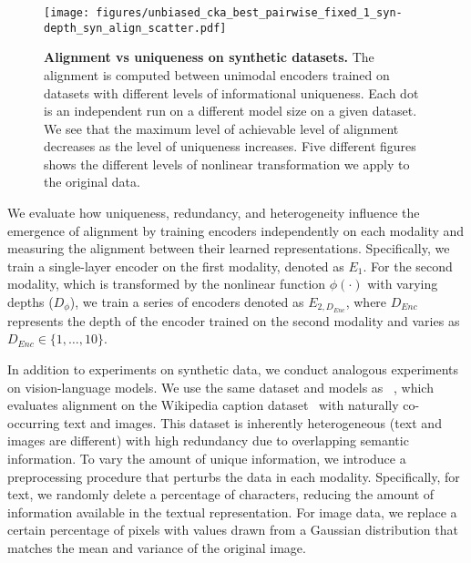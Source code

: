 \begin{figure*}[t!]
    \centering
    \texttt{[image: figures/unbiased\_cka\_best\_pairwise\_fixed\_1\_syn-depth\_syn\_align\_scatter.pdf]}
    \vspace{-2em}
    \caption{\textbf{Alignment vs uniqueness on synthetic datasets.} The alignment is computed between unimodal encoders trained on datasets with different levels of informational uniqueness. Each dot is an independent run on a different model size on a given dataset. We see that the maximum level of achievable level of alignment decreases as the level of uniqueness increases. Five different figures shows the different levels of nonlinear transformation we apply to the original data.}
    \label{fig:align_unique}
\end{figure*}
We evaluate how uniqueness, redundancy, and heterogeneity influence the emergence of alignment by training encoders independently on each modality and measuring the alignment between their learned representations. Specifically, we train a single-layer encoder on the first modality, denoted as \(E_1\). For the second modality, which is transformed by the nonlinear function \(\phi(\cdot)\) with varying depths (\(D_\phi\)), we train a series of encoders denoted as \(E_{2,D_{Enc}}\), where \(D_{Enc}\) represents the depth of the encoder trained on the second modality and varies as \(D_{Enc} \in \{1, \ldots, 10\}\).

In addition to experiments on synthetic data, we conduct analogous experiments on vision-language models. We use the same dataset and models as ~\citet{huh_platonic_2024}, which evaluates alignment on the Wikipedia caption dataset~\citep{srinivasan_wit_2021} with naturally co-occurring text and images. This dataset is inherently heterogeneous (text and images are different) with high redundancy due to overlapping semantic information. To vary the amount of unique information, we introduce a preprocessing procedure that perturbs the data in each modality. Specifically, for text, we randomly delete a percentage of characters, reducing the amount of information available in the textual representation. For image data, we replace a certain percentage of pixels with values drawn from a Gaussian distribution that matches the mean and variance of the original image.




